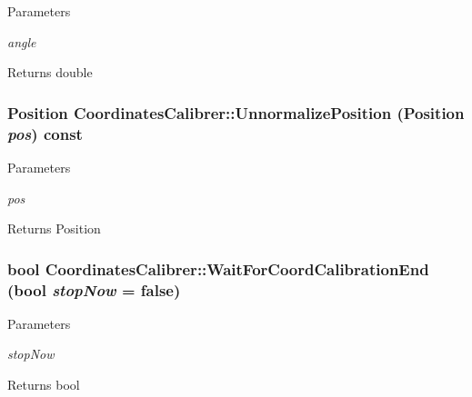 \begin{DoxyParams}{Parameters}
\item[{\em angle}]\end{DoxyParams}
\begin{DoxyReturn}{Returns}
double 
\end{DoxyReturn}
\hypertarget{classCoordinatesCalibrer_a8522193b13196313d001c589e7845bd3}{
\subsubsection[{UnnormalizePosition}]{\setlength{\rightskip}{0pt plus 5cm}Position CoordinatesCalibrer::UnnormalizePosition (Position {\em pos}) const}}
\label{classCoordinatesCalibrer_a8522193b13196313d001c589e7845bd3}

\begin{DoxyParams}{Parameters}
\item[{\em pos}]\end{DoxyParams}
\begin{DoxyReturn}{Returns}
Position 
\end{DoxyReturn}
\hypertarget{classCoordinatesCalibrer_a99563ba6e43f839bf1b10f55cf155125}{
\subsubsection[{WaitForCoordCalibrationEnd}]{\setlength{\rightskip}{0pt plus 5cm}bool CoordinatesCalibrer::WaitForCoordCalibrationEnd (bool {\em stopNow} = {\ttfamily false})}}
\label{classCoordinatesCalibrer_a99563ba6e43f839bf1b10f55cf155125}

\begin{DoxyParams}{Parameters}
\item[{\em stopNow}]\end{DoxyParams}
\begin{DoxyReturn}{Returns}
bool 
\end{DoxyReturn}


